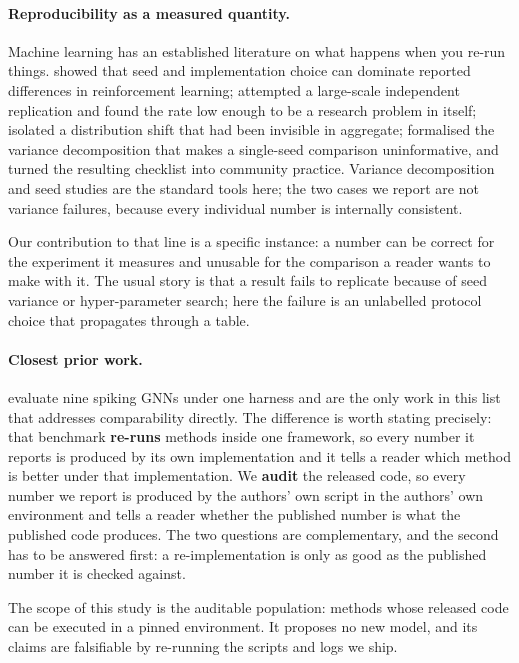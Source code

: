 \paragraph{Reproducibility as a measured quantity.} Machine learning has an established literature
on what happens when you re-run things. \citet{henderson2018deep} showed that seed and implementation
choice can dominate reported differences in reinforcement learning; \citet{raff2019step} attempted a
large-scale independent replication and found the rate low enough to be a research problem in itself;
\citet{recht2019imagenet} isolated a distribution shift that had been invisible in aggregate;
\citet{bouthillier2021accounting} formalised the variance decomposition that makes a single-seed
comparison uninformative, and \citet{pineau2021improving} turned the resulting checklist into
community practice. Variance decomposition and seed studies are the standard tools here; the two
cases we report are not variance failures, because every individual number is internally consistent.

Our contribution to that line is a specific instance: a number can be correct for the experiment it
measures and unusable for the comparison a reader wants to make with it. The usual story is that a
result fails to replicate because of seed variance or hyper-parameter search; here the failure is an
unlabelled protocol choice that propagates through a table.

\paragraph{Closest prior work.} \citet{zhang2025sgnnbench} evaluate nine spiking GNNs under one
harness and are the only work in this list that addresses comparability directly. The difference is
worth stating precisely: that benchmark \textbf{re-runs} methods inside one framework, so every
number it reports is produced by its own implementation and it tells a reader which method is better
under that implementation. We \textbf{audit} the released code, so every number we report is
produced by the authors' own script in the authors' own environment and tells a reader whether the
published number is what the published code produces. The two questions are complementary, and the
second has to be answered first: a re-implementation is only as good as the published number it is
checked against.

The scope of this study is the auditable population: methods whose released code can be executed in a
pinned environment. It proposes no new model, and its claims are falsifiable by re-running the
scripts and logs we ship.
